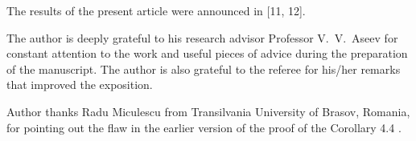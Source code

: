 \documentclass[11pt,a4paper]{article}
\begin{document}
\vspace{1em}
The results of the present article were announced in [11, 12].

\vspace{1ex} %
The author is deeply grateful to his research advisor Professor V.~V.~Aseev for constant attention
to the work and useful pieces of advice during the preparation of the manuscript. The author is also
grateful to the referee for his/her remarks that improved the exposition.

\vspace{1ex}
Author thanks Radu Miculescu from Transilvania University of Brasov, Romania,
for pointing out the flaw in the earlier version of the proof of the Corollary 4.4 \cite[p. 72]{Kr3}.


\end{document}

